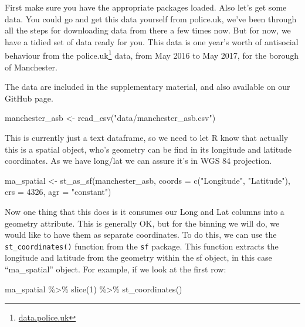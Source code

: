 \documentclass[
]{book}
\makeatletter
\newenvironment{Shaded}{\begin{snugshade}}{\end{snugshade}}
\newcommand{\AttributeTok}[1]{\textcolor[rgb]{0.61,0.61,0.61}{#1}}
\newcommand{\DecValTok}[1]{\textcolor[rgb]{0.06,0.06,0.06}{#1}}
\newcommand{\FunctionTok}[1]{\textcolor[rgb]{0,0,0}{#1}}
\newcommand{\NormalTok}[1]{#1}
\newcommand{\OtherTok}[1]{\textcolor[rgb]{0.37,0.37,0.37}{#1}}
\newcommand{\SpecialCharTok}[1]{\textcolor[rgb]{0,0,0}{#1}}
\newcommand{\StringTok}[1]{\textcolor[rgb]{0.5,0.5,0.5}{#1}}
\renewcommand{\href}[2]{#2\footnote{\url{#1}}}
\newenvironment{kframe}{%
\medskip{}
\setlength{\fboxsep}{.8em}
 \def\at@end@of@kframe{}%
 \ifinner\ifhmode%
  \def\at@end@of@kframe{\end{minipage}}%
  \begin{minipage}{\columnwidth}%
 \fi\fi%
 \def\FrameCommand##1{\hskip\@totalleftmargin \hskip-\fboxsep
 \colorbox{shadecolor}{##1}\hskip-\fboxsep
     \hskip-\linewidth \hskip-\@totalleftmargin \hskip\columnwidth}%
 \MakeFramed {\advance\hsize-\width
   \@totalleftmargin\z@ \linewidth\hsize
   \@setminipage}}%
 {\par\unskip\endMakeFramed%
 \at@end@of@kframe}
\renewenvironment{Shaded}{\begin{kframe}}{\end{kframe}}
\makeatother
\begin{document}
First make sure you have the appropriate packages loaded. Also let's get some data. You could go and get this data yourself from police.uk, we've been through all the steps for downloading data from there a few times now. But for now, we have a tidied set of data ready for you. This data is one year's worth of antisocial behaviour from the \href{data.police.uk}{police.uk} data, from May 2016 to May 2017, for the borough of Manchester.

The data are included in the supplementary material, and also available on our GitHub page.

\begin{Shaded}
\begin{Highlighting}[]
\NormalTok{manchester\_asb }\OtherTok{\textless{}{-}} \FunctionTok{read\_csv}\NormalTok{(}\StringTok{"data/manchester\_asb.csv"}\NormalTok{)}
\end{Highlighting}
\end{Shaded}

This is currently just a text dataframe, so we need to let R know that actually this is a spatial object, who's geometry can be find in its longitude and latitude coordinates. As we have long/lat we can assure it's in WGS 84 projection.

\begin{Shaded}
\begin{Highlighting}[]
\NormalTok{ma\_spatial }\OtherTok{\textless{}{-}} \FunctionTok{st\_as\_sf}\NormalTok{(manchester\_asb, }
                       \AttributeTok{coords =} \FunctionTok{c}\NormalTok{(}\StringTok{"Longitude"}\NormalTok{, }\StringTok{"Latitude"}\NormalTok{),}
                       \AttributeTok{crs =} \DecValTok{4326}\NormalTok{, }
                       \AttributeTok{agr =} \StringTok{"constant"}\NormalTok{)}
\end{Highlighting}
\end{Shaded}

Now one thing that this does is it consumes our Long and Lat columns into a geometry attribute. This is generally OK, but for the binning we will do, we would like to have them as separate coordinates. To do this, we can use the \texttt{st\_coordinates()} function from the \texttt{sf} package. This function extracts the longitude and latitude from the geometry within the sf object, in this case ``ma\_spatial'' object. For example, if we look at the first row:

\begin{Shaded}
\begin{Highlighting}[]
\NormalTok{ma\_spatial }\SpecialCharTok{\%\textgreater{}\%} 
  \FunctionTok{slice}\NormalTok{(}\DecValTok{1}\NormalTok{) }\SpecialCharTok{\%\textgreater{}\%} 
  \FunctionTok{st\_coordinates}\NormalTok{()}
\end{Highlighting}
\end{Shaded}
\end{document}
